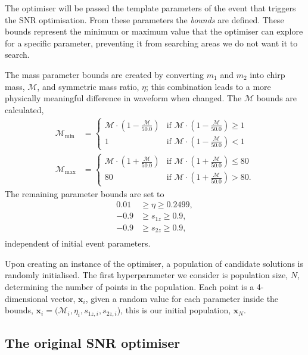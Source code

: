 The optimiser will be passed the template parameters of the event that triggers the SNR optimisation. From these parameters the \textit{bounds} are defined. These bounds represent the minimum or maximum value that the optimiser can explore for a specific parameter, preventing it from searching areas we do not want it to search.

The mass parameter bounds are created by converting $m_{1}$ and $m_{2}$ into chirp mass, $\mathcal{M}$, and symmetric mass ratio, $\eta$; this combination leads to a more physically meaningful difference in waveform when changed. The $\mathcal{M}$ bounds are calculated,
%
\begin{align}
    \mathcal{M}_{\min} &= 
    \begin{cases}
        \mathcal{M} \cdot \left(1 - \frac{\mathcal{M}}{50.0}\right) & \text{if } \mathcal{M} \cdot \left(1 - \frac{\mathcal{M}}{50.0}\right) \geq 1 \\
        1 & \text{if } \mathcal{M} \cdot \left(1 - \frac{\mathcal{M}}{50.0}\right) < 1
    \end{cases} \\
    \mathcal{M}_{\max} &= 
    \begin{cases}
        \mathcal{M} \cdot \left(1 + \frac{\mathcal{M}}{50.0}\right) & \text{if } \mathcal{M} \cdot \left(1 + \frac{\mathcal{M}}{50.0}\right) \leq 80 \\
        80 & \text{if } \mathcal{M} \cdot \left(1 + \frac{\mathcal{M}}{50.0}\right) > 80.
    \end{cases}
\end{align}
%
The remaining parameter bounds are set to
%
\begin{align}
    0.01 &\ge \eta \ge 0.2499, \\
    -0.9 &\ge s_{1z} \ge 0.9, \\
    -0.9 &\ge s_{2z} \ge 0.9, \\
\end{align}
%
independent of initial event parameters.

Upon creating an instance of the optimiser, a population of candidate solutions is randomly initialised. The first hyperparameter we consider is population size, $N$, determining the number of points in the population. Each point is a 4-dimensional vector, $\textbf{x}_{i}$, given a random value for each parameter inside the bounds, $\textbf{x}_{i} = (\mathcal{M}_{i}, \eta_{i}, s_{1z, i}, s_{2z, i}$), this is our initial population, $\textbf{x}_{N}$.

\subsection{\label{7:sec:original_de}The original SNR optimiser}

